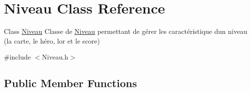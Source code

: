 \hypertarget{classNiveau}{}\section{Niveau Class Reference}
\label{classNiveau}


Class \hyperlink{classNiveau}{Niveau} Classe de \hyperlink{classNiveau}{Niveau} permettant de gérer les caractéristique d\textquotesingle{}un niveau (la carte, le héro, l\textquotesingle{}or et le score)  




{\ttfamily \#include $<$Niveau.\+h$>$}

\subsection*{Public Member Functions}
